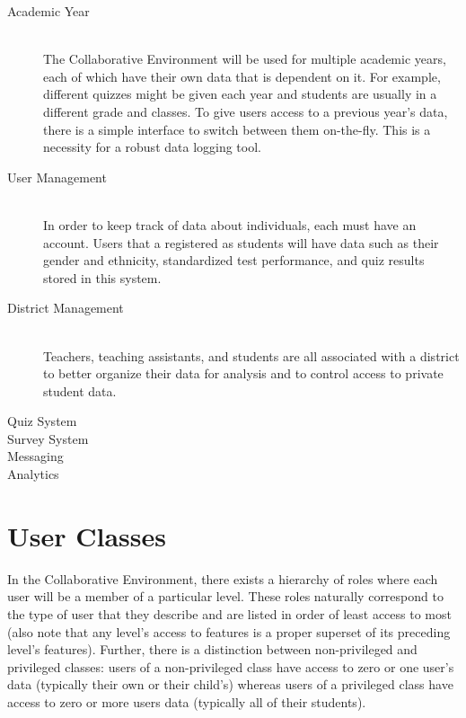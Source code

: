 \begin{description}
	\item [Academic Year] \hfill \\ The Collaborative Environment will be used for multiple academic years, each of which have their own data that is dependent on it. For example, different quizzes might be given each year and students are usually in a different grade and classes. To give users access to a previous year's data, there is a simple interface to switch between them on-the-fly. This is a necessity for a robust data logging tool.
	\item [User Management] \hfill \\ In order to keep track of data about individuals, each must have an account. Users that a registered as students will have data such as their gender and ethnicity, standardized test performance, and quiz results stored in this system.
	\item [District Management] \hfill \\ Teachers, teaching assistants, and students are all associated with a district to better organize their data for analysis and to control access to private student data.
	\item [Quiz System]
	\item [Survey System]
	\item [Messaging]
	\item [Analytics]
\end{description}

\section{User Classes}
\label{sec:overview-user-classes}

In the Collaborative Environment, there exists a hierarchy of roles where each user will be a member of a particular level. These roles naturally correspond to the type of user that they describe and are listed in order of least access to most (also note that any level's access to features is a proper superset of its preceding level's features). Further, there is a distinction between non-privileged and privileged classes: users of a non-privileged class have access to zero or one user's data (typically their own or their child's) whereas users of a privileged class have access to zero or more users data (typically all of their students).

